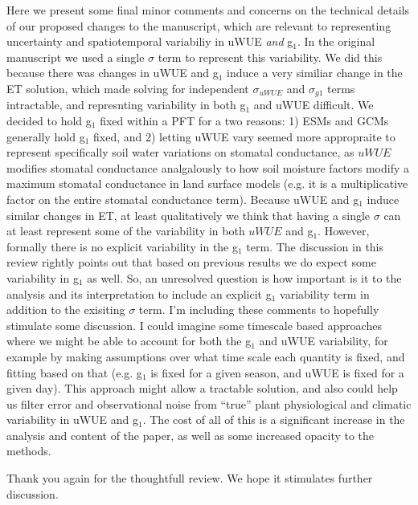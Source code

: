 Here we present some final minor comments and concerns on the
technical details of our proposed changes to the manuscript, which are
relevant to representing uncertainty and spatiotemporal variabiliy in
uWUE \textit{and} g$_1$. In the original manuscript we used a single
$\sigma$ term to represent this variability. We did this because there
was changes in uWUE and g$_1$ induce a very similiar change in the ET
solution, which made solving for independent $\sigma_{uWUE}$ and
$\sigma_{g1}$ terms intractable, and represnting variability in both
g$_1$ and uWUE difficult. We decided to hold g$_1$ fixed within a PFT
for a two reasons: 1) ESMs and GCMs generally hold g$_1$ fixed, and 2)
letting uWUE vary seemed more appropraite to represent specifically
soil water variations on stomatal conductance, as $uWUE$ modifies
stomatal conductance analgalously to how soil moisture factors modify
a maximum stomatal conductance in land surface models (e.g. it is a
multiplicative factor on the entire stomatal conductance
term). Because uWUE and g$_1$ induce similar changes in ET, at least
qualitatively we think that having a single $\sigma$ can at least
represent some of the variability in both $uWUE$ and g$_1$. However,
formally there is no explicit variability in the g$_1$ term. The
discussion in this review rightly points out that based on previous
results we do expect some variability in g$_1$ as well. So, an
unresolved question is how important is it to the analysis and its
interpretation to include an explicit g$_1$ variability term in
addition to the exisiting $\sigma$ term. I'm including these comments
to hopefully stimulate some discussion. I could imagine some timescale
based approaches where we might be able to account for both the g$_1$
and uWUE variability, for example by making assumptions over what time
scale each quantity is fixed, and fitting based on that (e.g. g$_1$ is
fixed for a given season, and uWUE is fixed for a given day). This
approach might allow a tractable solution, and also could help us
filter error and observational noise from ``true''  plant
physiological and climatic variability in uWUE and g$_1$. The cost of
all of this is a significant increase in the analysis and content of
the paper, as well as some increased opacity to the methods.

Thank you again for the thoughtfull review. We hope it stimulates
further discussion.


